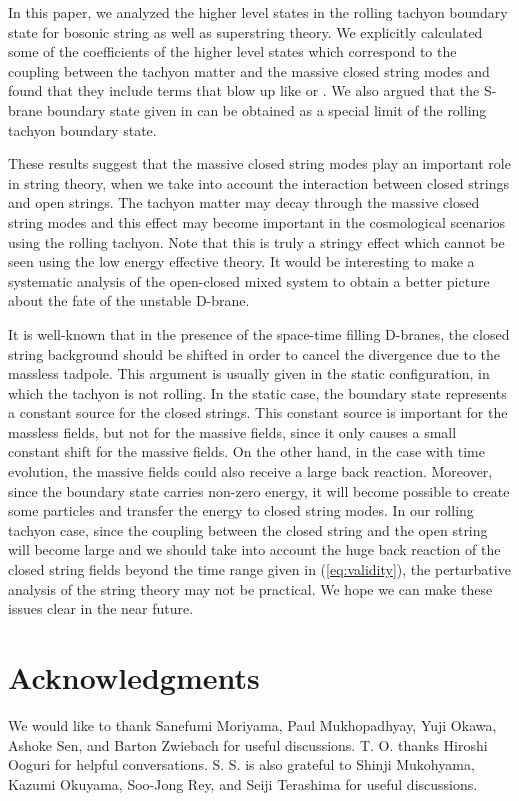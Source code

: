 \documentclass[a4paper,12pt]{article} \textheight=8.5truein
\begin{document}
In this paper, we analyzed the higher level states in the rolling
tachyon boundary state for bosonic string as well as superstring
theory. We explicitly calculated some of the coefficients of the
higher level states which correspond to the coupling between the
tachyon matter and the massive closed string modes and found that
they include terms that blow up like \coordHE{} or \coordHE{}.
We also argued that the S-brane boundary state given in
\cite{Gutperle:2002ai} can be obtained as a special limit of the
rolling tachyon boundary state.

These results suggest that the massive closed string modes play an
important role in string theory, when we take into account the
interaction between closed strings and open strings. The tachyon
matter may decay through the massive closed string modes and this
effect may become important in the cosmological scenarios using
the rolling tachyon. Note that this is truly a stringy effect
which cannot be seen using the low energy effective theory. It
would be interesting to make a systematic analysis of the
open-closed mixed system to obtain a better picture about the fate
of the unstable D-brane.

It is well-known that in the presence of the space-time filling
D-branes, the closed string background should be shifted in order
to cancel the divergence due to the massless tadpole. This
argument is usually given in the static configuration, in which
the tachyon is not rolling. In the static case, the boundary state
represents a constant source for the closed strings. This constant
source is important for the massless fields, but not for the
massive fields, since it only causes a small constant shift for
the massive fields. On the other hand, in the case with time
evolution, the massive fields could also receive a large back
reaction. Moreover, since the boundary state carries non-zero
energy, it will become possible to create some particles and
transfer the energy to closed string modes. In our rolling tachyon
case, since the coupling between the closed string and the open
string will become large and we should take into account the huge
back reaction of the closed string fields beyond the time range
given in (\ref{eq:validity}), the perturbative analysis of the
string theory may not be practical. We hope we can make these
issues clear in the near future.
\section*{Acknowledgments}
We would like to thank Sanefumi Moriyama, Paul Mukhopadhyay, Yuji
Okawa, Ashoke Sen, and Barton Zwiebach for useful discussions. T.
O. thanks Hiroshi Ooguri for helpful conversations. S. S. is also
grateful to Shinji Mukohyama, Kazumi Okuyama, Soo-Jong Rey, and
Seiji Terashima for useful discussions.
\end{document}
